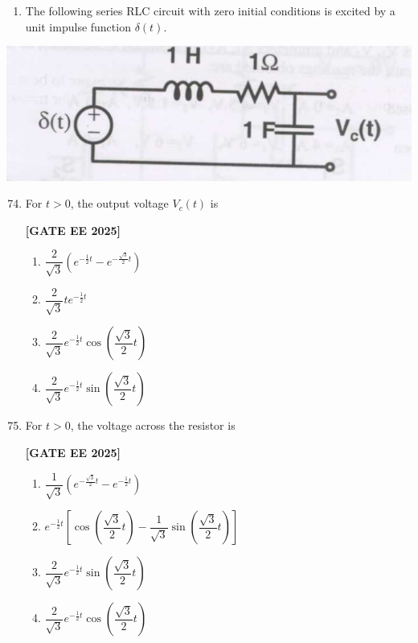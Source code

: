 \documentclass[12pt]{article}
\begin{document}
\begin{enumerate}
\item The following series RLC circuit with zero initial conditions is excited by a unit impulse function $\delta(t)$.
\end{enumerate}
 
\begin{center}
\includegraphics[width=0.6\columnwidth]{figs/q7475.png}
\end{center}

\begin{enumerate}[leftmargin=*, label=\textbf{Q.\arabic*:}]
\setcounter{enumi}{73}

\item For $t>0$, the output voltage $V_c(t)$ is
 
\noindent \textbf{[GATE EE 2025]}
\begin{enumerate}
  \item $\dfrac{2}{\sqrt{3}}\left(e^{-\frac{1}{2}t} - e^{-\frac{\sqrt{3}}{2}t}\right)$
  \item $\dfrac{2}{\sqrt{3}} t e^{-\frac{1}{2} t}$
  \item $\dfrac{2}{\sqrt{3}} e^{-\frac{1}{2} t} \cos\left( \dfrac{\sqrt{3}}{2} t \right)$
  \item $\dfrac{2}{\sqrt{3}} e^{-\frac{1}{2} t} \sin\left( \dfrac{\sqrt{3}}{2} t \right)$
\end{enumerate}

\item For $t>0$, the voltage across the resistor is
 
\noindent \textbf{[GATE EE 2025]}
\begin{enumerate}
  \item $\dfrac{1}{\sqrt{3}} \left( e^{-\frac{\sqrt{3}}{2} t} - e^{-\frac{1}{2} t} \right)$
  \item $e^{-\frac{1}{2} t} \left[ \cos \left( \dfrac{\sqrt{3}}{2} t \right) - \dfrac{1}{\sqrt{3}} \sin \left( \dfrac{\sqrt{3}}{2} t \right) \right]$
  \item $\dfrac{2}{\sqrt{3}} e^{-\frac{1}{2} t} \sin \left( \dfrac{\sqrt{3}}{2} t \right)$
  \item $\dfrac{2}{\sqrt{3}} e^{-\frac{1}{2} t} \cos \left( \dfrac{\sqrt{3}}{2} t \right)$
\end{enumerate}

\end{enumerate}
\end{document}
